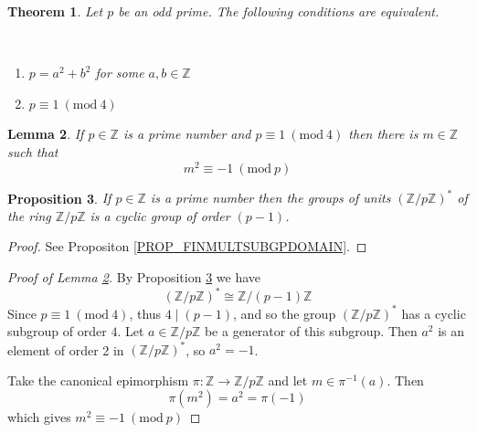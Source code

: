 \documentclass[12pt, letterpaper, oneside]{article}
\theoremstyle{plain}
\newtheorem{theorem}{Theorem}[section]
\newtheorem{lemma}[theorem]{Lemma}
\newtheorem{proposition}[theorem]{Proposition}
\theoremstyle{definition}
\newcommand{\Z}{{\mathbb Z}}
\newcommand{\benu}{\begin{enumerate}}
\newcommand{\eenu}{\end{enumerate}}
\newcommand{\vs}{\vskip 5mm}
\newcommand{\isep}[1][0]{\setlength{\itemsep}{#1 mm}}
\begin{document}
\begin{theorem}
\label{THM_PRIMESUMOFSQUARES}
Let $p$ be an odd prime. The following conditions are equivalent.

\vskip -12mm

\ 
\benu
\isep[0]
\item $p= a^{2}+b^{2}$ for some $a, b\in \Z$
\item $p \equiv 1\ (\mathrm{mod} \ 4)$
\eenu


\end{theorem}

\vs\vs

\begin{lemma}
\label{LEMMA_PRIME1MOD4}
If $p\in \Z$ is a prime number and $p\equiv 1 \  (\mathrm{mod} \ 4)$ then there is 
$m\in \Z$ such that 
$$m^{2} \equiv -1 \  (\mathrm{mod} \ p)$$
\end{lemma}


\vs\vs



\begin{proposition}
\label{PROP_ZPUNITS}
If $p\in \Z$ is a prime number then the groups of units $(\Z/p\Z)^{\ast}$ of the ring $\Z/p\Z$ 
is a cyclic group of order $(p-1)$.
\end{proposition}

\vs

\begin{proof}
See Propositon \ref{PROP_FINMULTSUBGPDOMAIN}.
\end{proof}

\vs\vs

\begin{proof}[Proof of Lemma \ref{LEMMA_PRIME1MOD4}]
By Proposition \ref{PROP_ZPUNITS} we have 
$$(\Z/p\Z)^{\ast} \cong \Z/(p-1)\Z$$
Since $p\equiv 1 \  (\mathrm{mod} \ 4)$,  thus $4 \mid (p-1)$, and so the group 
$(\Z/p\Z)^{\ast}$ has a cyclic subgroup of order $4$. Let $a\in \Z/p\Z$ be a generator 
of this subgroup. Then $a^{2}$ is an element of order 2 in $(\Z/p\Z)^{\ast}$, so $a^{2} = -1$. 

Take the canonical epimorphism 
$\pi\colon \Z \to \Z/p\Z$ and let $m\in \pi^{-1}(a)$. Then 
$$\pi(m^{2}) = a^{2} = \pi(-1)$$
which gives $m^{2} \equiv -1 \  (\mathrm{mod} \ p)$
\end{proof}

\vs\vs
\end{document}
